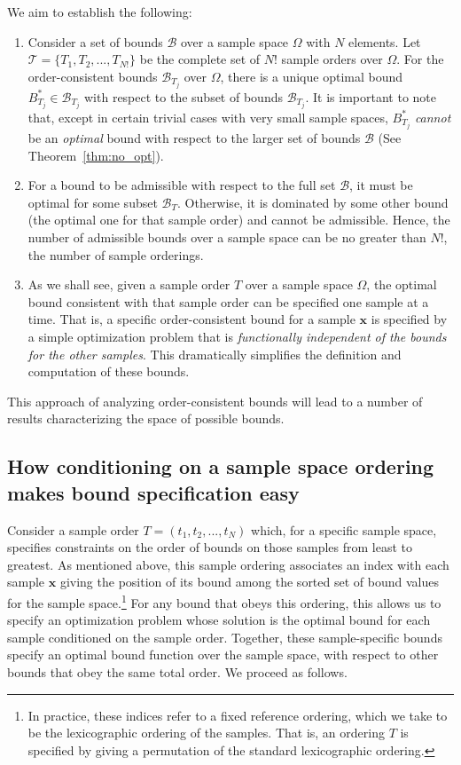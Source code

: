 \documentclass{article}
\theoremstyle{definition}
\theoremstyle{remark}
\def\x{\mathbf{x}}
\begin{document}
We aim to establish the following:
\begin{enumerate}
    \item Consider a set of bounds $\mathcal{B}$ over a sample space $\Omega$ with $N$ elements. Let 
    $\mathcal{T}=\{T_1,T_2,...,T_{N!}\}$ be the complete set of $N!$ sample orders over $\Omega$.  For the order-consistent bounds  $\mathcal{B}_{T_j}$ over $\Omega$, there is a unique optimal bound $B^*_{T_j}\in \mathcal{B}_{T_j}$ with respect to the subset of bounds $\mathcal{B}_{T_j}$. It is important to note that, except in certain trivial cases with very small sample spaces, $B^*_{T_j}$ {\em cannot} be an \textit{optimal} bound with respect to the larger set of bounds $\mathcal{B}$ (See Theorem~\ref{thm:no_opt}). 
    \item For a bound to be admissible with respect to the full set $\mathcal{B}$, it must be optimal for some subset $\mathcal{B}_T$. Otherwise, it is dominated by some other bound (the optimal one for that sample order) and cannot be admissible. Hence, the number of admissible bounds over a sample space can be no greater than $N!$, the number of sample orderings.
    \item As we shall see, given a sample order $T$ over a sample space $\Omega$, the optimal bound consistent with that sample order can be specified one sample at a time. That is, a specific order-consistent bound for a sample $\x$ is specified by a simple optimization problem that is {\em functionally independent of the bounds for the other samples}. This dramatically simplifies the definition and computation of these  bounds. 
\end{enumerate}
This approach of analyzing order-consistent bounds will lead to a number of results characterizing the space of possible bounds.

\subsection{How conditioning on a sample space ordering makes bound specification easy}
Consider a sample order $T=(t_1,t_2,...,t_N)$ which, for a specific sample space, specifies constraints on the order of bounds on those samples from least to greatest. As mentioned above, this sample ordering associates an index with each sample $\x$ giving the position of its bound among the sorted set of bound values for the sample space.\footnote{In practice, these indices refer to a fixed reference ordering, which we take to be the lexicographic ordering of the samples. That is, an ordering $T$ is specified by giving a permutation of the standard lexicographic ordering.}  For any bound that obeys this ordering, this allows us to specify an optimization problem whose solution is the optimal bound for each sample conditioned on the sample order. Together, these sample-specific bounds specify an optimal bound function over the sample space, with respect to other bounds that obey the same total order. We proceed as follows.
\end{document}
